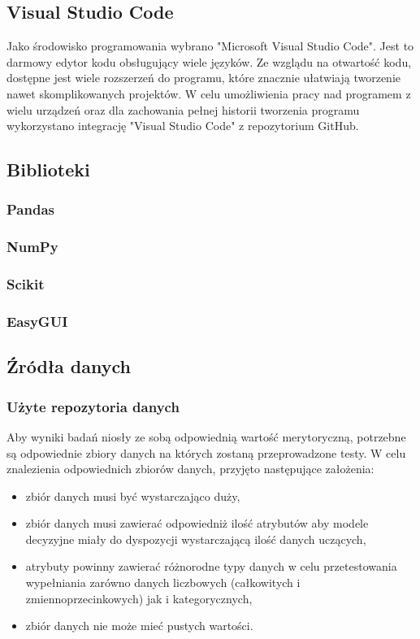 \documentclass[12pt,twoside]{article}
\begin{document}
\subsection{Visual Studio Code}

Jako środowisko programowania wybrano "Microsoft Visual Studio Code".
Jest to darmowy edytor kodu obsługujący wiele języków.
Ze wzglądu na otwartość kodu, dostępne jest wiele rozszerzeń do programu,
które znacznie ułatwiają tworzenie nawet skomplikowanych projektów.
W celu umożliwienia pracy nad programem z wielu urządzeń
oraz dla zachowania pełnej historii tworzenia programu wykorzystano integrację "Visual Studio Code" z repozytorium GitHub.
\subsection{Biblioteki}
\subsubsection{Pandas}
\subsubsection{NumPy}
\subsubsection{Scikit}
\subsubsection{EasyGUI}
\subsection{Źródła danych}

\subsubsection{Użyte repozytoria danych}

Aby wyniki badań niosły ze sobą odpowiednią wartość merytoryczną,
potrzebne są odpowiednie zbiory danych na których zostaną przeprowadzone testy.
W celu znalezienia odpowiednich zbiorów danych, przyjęto następujące założenia:

\begin{itemize}[label=-,labelsep=0.4cm, leftmargin=1.25cm]
    \item zbiór danych musi być wystarczająco duży,
    \item zbiór danych musi zawierać odpowiedniż ilość atrybutów aby modele decyzyjne miały
    do dyspozycji wystarczającą ilość danych uczących,
    \item atrybuty powinny zawierać różnorodne typy danych w celu przetestowania wypełniania zarówno danych
    liczbowych (całkowitych i zmiennoprzecinkowych) jak i kategorycznych,
    \item zbiór danych nie może mieć pustych wartości.
\end{itemize}
\end{document}
